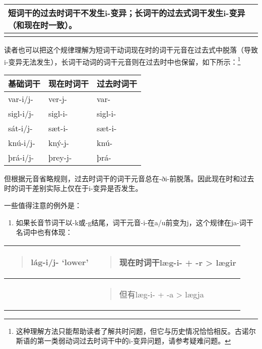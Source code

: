 \begin{longtable}{l}
  \toprule
  短词干的过去时词干不发生i-变异；长词干的过去式词干发生i-变异（和现在时一致）。 \\
  \midrule
  \endhead
  \bottomrule
  \endfoot
\end{longtable}

读者也可以把这个规律理解为短词干动词现在时的词干元音在过去式中脱落（导致i-变异无法发生），长词干动词的词干元音则在过去时中也保留，如下所示：\footnote{这种理解方法只能帮助读者了解共时问题，但它与历史情况恰恰相反。古诺尔斯语的第一类弱动词过去时词干中的i-变异问题，请参考疑难问题。}

\begin{longtable}{lll}
  \toprule
  基础词干      & 现在时词干   & 过去时词干   \\
  \midrule
  \endhead
  \bottomrule
  \endfoot
  var-i/j-  & ver-j-  & var-    \\
  sigl-i/j- & sigl-i- & sigl-i- \\
  sát-i/j-  & sæt-i-  & sæt-i-  \\
  knú-i/j-  & kný-j-  & knú-    \\
  þrá-i/j-  & þrey-j- & þrá-    \\
\end{longtable}

但根据元音省略规则，过去时词干的词干元音总在-ði-前脱落。因此现在时和过去时的词干差别实际上仅在于i-变异是否发生。

一些值得注意的例外是：

\begin{enumerate}
  \def\labelenumi{\arabic{enumi})}
  \item
        如果长音节词干以-k或-g结尾，词干元音-i-在a/u前变为j，这个规律在ja-词干名词中也有体现：
\end{enumerate}

\begin{longtable}{ll}
  \toprule
  \begin{quote}lág-i/j- `lower‌'\end{quote} & \begin{quote}现在时词干læg-i- + -r \textgreater{} lægir\end{quote} \\
  \midrule
  \endhead
  \bottomrule
  \endfoot
                                           & \begin{minipage}[t]{\linewidth}\raggedright
                                               \begin{quote}
      但有læg-i- + -a \textgreater{} lægja
    \end{quote}
                                             \end{minipage}                    \\
\end{longtable}

